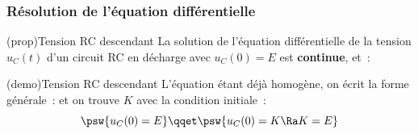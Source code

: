 \documentclass[../../main/main.tex]{subfiles}
\begin{document}
\subsubsection{Résolution de l'équation différentielle}
	\begin{tcb*}[label=prop:ucsolu](prop){Tension RC descendant}
		La solution de l'équation différentielle de la tension $u_C(t)$
		d'un circuit RC en décharge avec $u_C(0) = E$ est \textbf{continue}, et~:
		\psw{%
			\[\boxed{u_C(t) = E\exp\left(-\frac{t}{\tau}\right)}\]
		}%
	\end{tcb*}
	\begin{tcb*}[label=demo:rcsolu](demo){Tension RC descendant}
		L'équation étant déjà homogène, on écrit la forme générale~:
		\psw{%
			\[u_C(t) = K\exp\left( -\frac{t}{\tau} \right)\]
		}%
		et on trouve $K$ avec la condition initiale~:
		\[
			\psw{u_C(0) = E}
			\qqet
			\psw{u_C(0) = K \Ra K=E}
		\]
	\end{tcb*}
\end{document}
